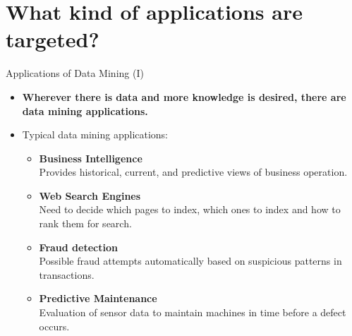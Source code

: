 \section{What kind of applications are targeted?}

\begin{frame}{Applications of Data Mining (I)}
	\begin{itemize}
		\item \textbf{Wherever there is data and more knowledge is desired, 
		there are data mining applications.}\\
		\item Typical data mining applications:
		\begin{itemize}
			\item \textbf{Business Intelligence} \\
				  \small{Provides historical, current, and predictive views of 
				  business operation.}
			\item \textbf{Web Search Engines} \\
				  \small{Need to decide which pages to index, which ones to 
				  index and how to rank them for search.}
			\item \textbf{Fraud detection} \\
				  \small{Possible fraud attempts automatically based on 
				  suspicious patterns in transactions.}
			\item \textbf{Predictive Maintenance} \\
				  \small{Evaluation of sensor data to maintain machines in time 
				  before a defect occurs.}
		\end{itemize}
	\end{itemize}
\end{frame}

